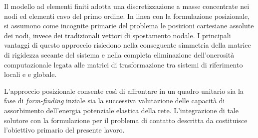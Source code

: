 Il modello ad elementi finiti adotta una discretizzazione a masse concentrate nei nodi ed elementi cavo del primo ordine. In linea con la formulazione posizionale, si assumono come incognite primarie del problema le posizioni cartesiane assolute dei nodi, invece dei tradizionali vettori di spostamento nodale. I principali vantaggi di questo approccio risiedono nella conseguente simmetria della matrice di rigidezza secante del sistema e nella completa eliminazione dell'onerosità computazionale legata alle matrici di trasformazione tra sistemi di riferimento locali e e globale.

L'approccio posizionale consente così di affrontare in un quadro unitario sia la fase di \textit{form-finding} inziale sia la successiva valutazione delle capacità di assorbimento dell'energia potenziale elastica della rete. L'integrazione di tale solutore con la formulazione per il problema di contatto descritta da \textcite{Fisicaro} costituisce l'obiettivo primario del presente lavoro.










